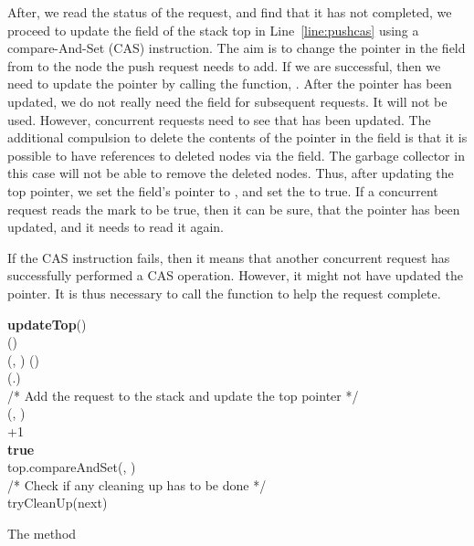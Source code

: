 \documentclass{llncs}
\begin{document}
After, we read the status of the request, and find that it has not completed, we proceed to update the  
field of the stack top in Line~\ref{line:pushcas} using a compare-And-Set (CAS) instruction. The aim is to change the pointer in 
the  field from  to the node the push request needs to add. 
If we are successful, then we need to update the  pointer by calling the 
function, . After the  pointer has been updated, we do not really need the  field for 
subsequent  requests. It will not be used. However, concurrent requests need to see that  
has been updated. The additional compulsion to delete the contents of the pointer in the  field is that 
it is possible to have references to deleted nodes via the  field. The garbage collector in this case will 
not be able to remove the deleted nodes. Thus, after updating the top pointer, we set the  field's 
pointer to , and set the  to true. If a  concurrent request reads the mark to be true, then it can be 
sure, that the  pointer has been updated, and it needs to read it again.

If the CAS instruction fails, then it means that another concurrent request has successfully performed a CAS 
operation. However, it might not have updated the  pointer. It is thus necessary to call the  
function to help the request complete. 

\vspace{-8mm}
\begin{algorithm}
\scriptsize
\SetAlgoLined	
\textbf{updateTop}(){}\\
		  ()\\
		(, )  ()\\
		\If{   \label{line:nextnonnull} }
		{
	    	  (.) \\
			\If{() \&\& }
			{
/* Add the request to the stack and update the top pointer */ \\
				(, ) \label{line:push_prev} \\
				   +1 \label{line:index}\\
				  \textbf{true} \label{line:announce} \\
				  top.compareAndSet(, ) \label{line:updatetop} \\
/* Check if any cleaning up has to be done */ \\
				{
					tryCleanUp(next) \label{line:trycleanup}
				}
			}
		}
\caption{The  method} \label{alg:updatetop} 
\end{algorithm}
\end{document}
